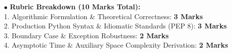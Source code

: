 \begin{examinertip}
$\bullet$ \textbf{Rubric Breakdown (10 Marks Total):}\\
1. Algorithmic Formulation \& Theoretical Correctness: \textbf{3 Marks}\\
2. Production Python Syntax \& Idiomatic Standards (PEP 8): \textbf{3 Marks}\\
3. Boundary Case \& Exception Robustness: \textbf{2 Marks}\\
4. Asymptotic Time \& Auxiliary Space Complexity Derivation: \textbf{2 Marks}
\end{examinertip}
